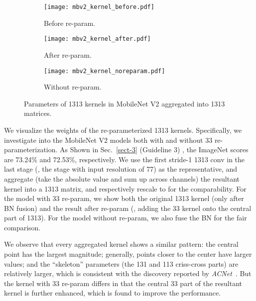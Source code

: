 \documentclass[10pt,twocolumn,letterpaper]{article}
\begin{document}
	\begin{figure}[t]
		\centering
		\begin{subfigure}{0.66\linewidth}
			\texttt{[image: mbv2\_kernel\_before.pdf]}
			\label{fig-kernel-before} 
			\vskip -0.3in
			\caption{Before re-param.}
		\end{subfigure}
		\begin{subfigure}{0.66\linewidth}
			\texttt{[image: mbv2\_kernel\_after.pdf]}
			\label{fig-kernel-after}
			\vskip -0.3in
			\caption{After re-param.}
		\end{subfigure}
		\begin{subfigure}{0.66\linewidth}
			\texttt{[image: mbv2\_kernel\_noreparam.pdf]}
			\label{fig-kernel-noreparam}
			\vskip -0.3in
			\caption{Without re-param.}
		\end{subfigure}
		\caption{Parameters of 1313 kernels in MobileNet V2 aggregated into 1313 matrices.}
		\label{fig-tradeoff}
		\vskip -0.15in
	\end{figure}
	
	We visualize the weights of the re-parameterized 1313 kernels. Specifically, we investigate into the MobileNet V2 models both with and without 33 re-parameterization. As Shown in Sec.~\ref{sect-3} (Guideline 3) , the ImageNet scores are 73.24\% and 72.53\%, respectively. We use the first stride-1 1313 conv in the last stage (\ie, the stage with input resolution of 77) as the representative, and aggregate (take the absolute value and sum up across channels) the resultant kernel into a 1313 matrix, and respectively rescale to  for the comparability. For the model with 33 re-param, we show both the original 1313 kernel (only after BN fusion) and the result after re-param (\ie, adding the 33 kernel onto the central part of 1313). For the model without re-param, we also fuse the BN for the fair comparison.
	
	We observe that every aggregated kernel shows a similar pattern: the central point has the largest magnitude; generally, points closer to the center have larger values; and the ``skeleton'' parameters (the 131 and 113 criss-cross parts) are relatively larger, which is consistent with the discovery reported by \emph{ACNet}~\cite{ding2019acnet}. But the kernel with 33 re-param differs in that the central 33 part of the resultant kernel is further enhanced, which is found to improve the performance.
	

	
	
	
\end{document}

